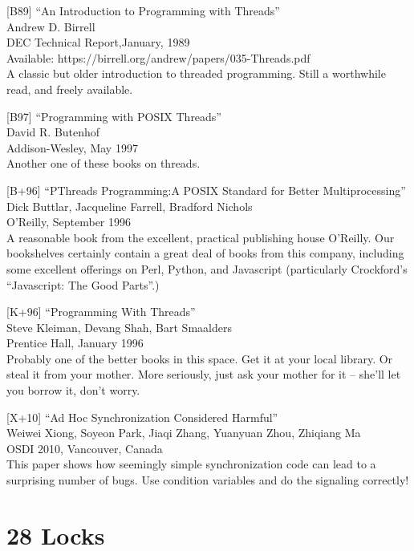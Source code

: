{[}B89{]} ``An Introduction to Programming with Threads''\\
Andrew D. Birrell\\
DEC Technical Report,January, 1989\\
Available: https://birrell.org/andrew/papers/035-Threads.pdf\\
A classic but older introduction to threaded programming. Still a
worthwhile read, and freely available.

{[}B97{]} ``Programming with POSIX Threads''\\
David R. Butenhof\\
Addison-Wesley, May 1997\\
Another one of these books on threads.

{[}B+96{]} ``PThreads Programming:A POSIX Standard for Better
Multiprocessing''\\
Dick Buttlar, Jacqueline Farrell, Bradford Nichols\\
O'Reilly, September 1996\\
A reasonable book from the excellent, practical publishing house
O'Reilly. Our bookshelves certainly contain a great deal of books from
this company, including some excellent offerings on Perl, Python, and
Javascript (particularly Crockford's ``Javascript: The Good Parts''.)

{[}K+96{]} ``Programming With Threads''\\
Steve Kleiman, Devang Shah, Bart Smaalders\\
Prentice Hall, January 1996\\
Probably one of the better books in this space. Get it at your local
library. Or steal it from your mother. More seriously, just ask your
mother for it -- she'll let you borrow it, don't worry.

{[}X+10{]} ``Ad Hoc Synchronization Considered Harmful''\\
Weiwei Xiong, Soyeon Park, Jiaqi Zhang, Yuanyuan Zhou, Zhiqiang Ma\\
OSDI 2010, Vancouver, Canada\\
This paper shows how seemingly simple synchronization code can lead to a
surprising number of bugs. Use condition variables and do the signaling
correctly!

\newpage

\hypertarget{locks-1}{%
\section*{28 Locks}\label{locks-1}}

